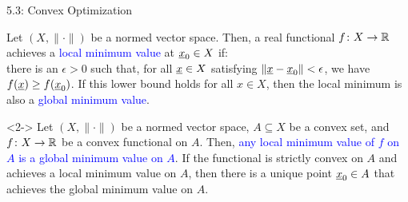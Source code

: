 \documentclass[10pt,english,aspectratio=169]{beamer}
\begin{document}
\begin{frame}{5.3: Convex Optimization}

\begin{definition}
Let $(X,\|\cdot\|)$ be a normed vector space.
Then, a real functional $f \colon X \rightarrow \mathbb{R}$ achieves a \textcolor{blue}{local minimum value} at $\underline{x}_0 \in X$ if: \\ \hspace{3mm}  there is an $\epsilon > 0$ such that, for all $\underline{x}\in X$ satisfying $\| \underline{x} - \underline{x}_0 \| < \epsilon$, we have  $f(\underline{x}) \geq f(\underline{x}_0)$.
If this lower bound holds for all $x\in X$, then the local minimum is also a \textcolor{blue}{global minimum value}.
\end{definition}

\vspace{2mm}

\begin{theorem}<2->
Let $(X,\|\cdot\|)$ be a normed vector space, $A \subseteq X$ be a convex set, and $f \colon X \rightarrow \mathbb{R}$ be a convex functional on $A$.
Then, \textcolor{blue}{any local minimum value of $f$ on $A$ is a global minimum value on $A$}.
If the functional is strictly convex on $A$ and achieves a local minimum value on $A$, then there is a unique point $\underline{x}_0 \in A$ that achieves the global minimum value on $A$.
\end{theorem}

\vspace{1mm}


\end{frame}
\end{document}
